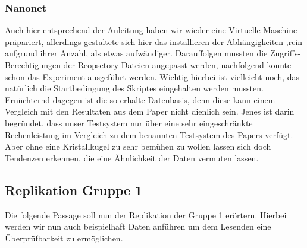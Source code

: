 \documentclass[sigconf,noacm,review]{acmart}
\begin{document}
\subsubsection{Nanonet}
Auch hier entsprechend der Anleitung haben wir wieder eine Virtuelle Maschine präpariert, allerdings gestaltete sich hier das installieren der Abhängigkeiten ,rein aufgrund ihrer Anzahl, als etwas aufwändiger. Darauffolgen mussten die Zugriffs-Berechtigungen der Reopsetory Dateien angepasst werden, nachfolgend konnte schon das Experiment ausgeführt werden. Wichtig hierbei ist vielleicht noch, das natürlich die Startbedingung des Skriptes eingehalten werden mussten. 
Ernüchternd dagegen ist die so erhalte Datenbasis, denn diese kann einem Vergleich mit den Resultaten aus dem Paper nicht dienlich sein. Jenes ist darin begründet, dass unser Testsystem nur über eine sehr eingeschränkte Rechenleistung im Vergleich zu dem benannten Testsystem des Papers verfügt. Aber ohne eine Kristallkugel zu sehr bemühen zu wollen lassen sich doch Tendenzen erkennen, die eine Ähnlichkeit der Daten vermuten lassen.
\subsection{Replikation Gruppe 1}
Die folgende Passage soll nun der Replikation der Gruppe 1 erörtern. Hierbei werden wir nun auch beispielhaft Daten anführen um dem Lesenden eine Überprüfbarkeit zu ermöglichen. 
\end{document}
